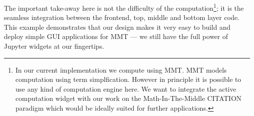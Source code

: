 The important take-away here is not the difficulty of the computation\footnote{
  In our current implementation we compute using MMT. 
  MMT models computation using term simplfication. 
  However in principle it is possible to use any kind of computation engine here. 
  We want to integrate the active computation widget with our work on the Math-In-The-Middle CITATION paradigm which would be ideally suited for further applications. 
}; it is the seamless integration between the frontend, top, middle and bottom layer code. 
This example demonstrates that our design makes it very easy to build and deploy simple GUI applications for MMT --- we still have the full power of Jupyter widgets at our fingertips. 


